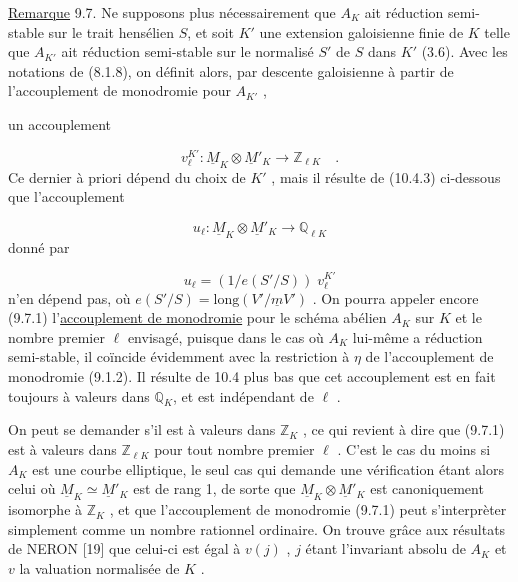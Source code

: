 \underline{Remarque} 9.7. Ne supposons plus nécessairement que $A_K$ ait réduction semi-stable sur le trait hensélien $S$, et soit $K'$ une extension galoisienne finie de $K$ telle que $A_{K'}$ ait réduction semi-stable sur le normalisé $S'$ de $S$ dans $K'$ (3.6). Avec les notations de (8.1.8), on définit alors, par descente galoisienne à partir de l'accouplement de monodromie pour $A_{K'}$ ,



un accouplement

\begin{equation}\tag{*}
v_\ell^{K'} : \underline{M}_K \otimes \underline{M}'_K \longrightarrow \mathbb{Z}_{\ell K} \quad .
\end{equation}
Ce dernier à priori dépend du choix de $K'$ , mais il résulte de (10.4.3) ci-dessous que l'accouplement

\begin{equation}\tag{9.7.1}
u_\ell : \underline{M}_K \otimes \underline{M}'_K \longrightarrow \mathbb{Q}_{\ell K}
\end{equation}
donné par

\begin{equation*}
u_\ell = (1/e(S'/S))\; v_\ell^{K'}
\end{equation*}
n'en dépend pas, où $e(S'/S) = \mathrm{long}(V'/\underline{m}V')$ . On pourra appeler encore (9.7.1) l'\underline{accouplement de monodromie} pour le schéma abélien $A_K$ sur $K$ et le nombre premier $\ell$ envisagé, puisque dans le cas où $A_K$ lui-même a réduction semi-stable, il coïncide évidemment avec la restriction à $\eta$ de l'accouplement de monodromie (9.1.2). Il résulte de 10.4 plus bas que cet accouplement est en fait toujours à valeurs dans $\mathbb{Q}_K$, et est indépendant de $\ell$ .

On peut se demander s'il est à valeurs dans $\mathbb{Z}_K$ , ce qui revient à dire que (9.7.1) est à valeurs dans $\mathbb{Z}_{\ell K}$ pour tout nombre premier $\ell$ . C'est le cas du moins si $A_K$ est une courbe elliptique, le seul cas qui demande une vérification étant alors celui où $\underline{M}_K \simeq \underline{M}'_K$ est de rang 1, de sorte que $\underline{M}_K \otimes \underline{M}'_K$ est canoniquement isomorphe à $\mathbb{Z}_K$ , et que l'accouplement de monodromie (9.7.1) peut s'interprèter simplement comme un nombre rationnel ordinaire. On trouve grâce aux résultats de NERON [19] que celui-ci est égal à $v(j)$ , $j$ étant l'invariant absolu de $A_K$ et $v$ la valuation normalisée de $K$ .


